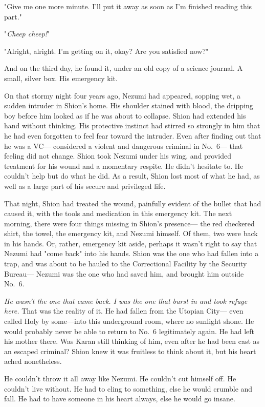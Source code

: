 "Give me one more minute. I'll put it away as soon as I'm finished
reading this part."

"\emph{Cheep cheep!}"

"Alright, alright. I'm getting on it, okay? Are you satisfied now?"

And on the third day, he found it, under an old copy of a science
journal. A small, silver box. His emergency kit.

On that stormy night four years ago, Nezumi had appeared, sopping wet, a
sudden intruder in Shion's home. His shoulder stained with blood, the
dripping boy before him looked as if he was about to collapse. Shion had
extended his hand without thinking. His protective instinct had stirred
so strongly in him that he had even forgotten to feel fear toward the
intruder. Even after finding out that he was a VC--- considered a violent
and dangerous criminal in No.~6--- that feeling did not change. Shion took
Nezumi under his wing, and provided treatment for his wound and a
momentary respite. He didn't hesitate to. He couldn't help but do what
he did. As a result, Shion lost most of what he had, as well as a large
part of his secure and privileged life.

That night, Shion had treated the wound, painfully evident of the bullet
that had caused it, with the tools and medication in this emergency kit.
The next morning, there were four things missing in Shion's presence---
the red checkered shirt, the towel, the emergency kit, and Nezumi
himself. Of them, two were back in his hands. Or, rather, emergency kit
aside, perhaps it wasn't right to say that Nezumi had "come back" into
his hands. Shion was the one who had fallen into a trap, and was about
to be hauled to the Correctional Facility by the Security Bureau--- Nezumi
was the one who had saved him, and brought him outside No.~6.

\emph{He wasn't the one that came back. I was the one that burst in and took
refuge here.} That was the reality of it. He had fallen from the Utopian
City--- even called Holy by some---into this underground room, where no
sunlight shone. He would probably never be able to return to No.~6
legitimately again. He had left his mother there. Was Karan still
thinking of him, even after he had been cast as an escaped criminal?
Shion knew it was fruitless to think about it, but his heart ached
nonetheless.

He couldn't throw it all away like Nezumi. He couldn't cut himself off.
He couldn't live without. He had to cling to something, else he would
crumble and fall. He had to have someone in his heart always, else he
would go insane.

